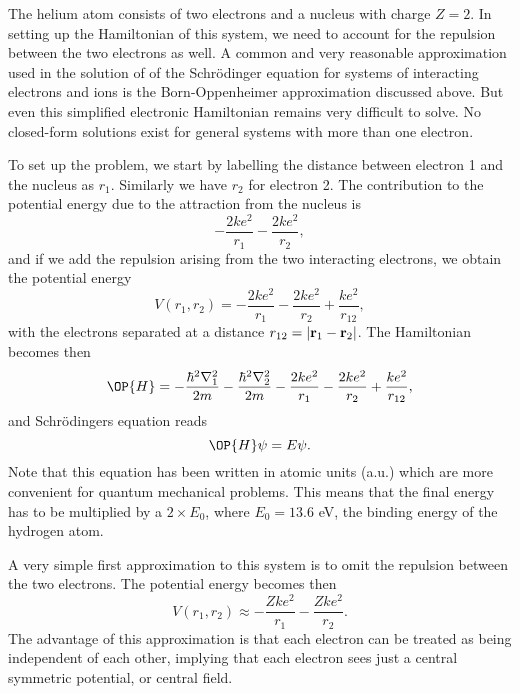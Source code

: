 The helium atom consists of two electrons and a nucleus with
charge $Z=2$. 
In setting up the Hamiltonian of this system, we need to account for
the repulsion between the two electrons as well. 
A common and very reasonable approximation used in the solution of 
of the Schr\"odinger equation for systems of interacting electrons and ions 
is the Born-Oppenheimer approximation discussed above. 
But even this simplified electronic Hamiltonian remains very difficult to
solve. No closed-form solutions exist for 
general systems with more than one electron. 

To set up the problem, 
we start by labelling the distance between electron 1 and the nucleus as 
$r_1$. Similarly we have $r_2$ for electron 2.
The contribution  
to the potential energy due to the attraction from the nucleus is
\[
   -\frac{2ke^2}{r_1}-\frac{2ke^2}{r_2},
\] 
and if we add the repulsion arising from the two 
interacting electrons, we obtain the potential energy
\[
 V(r_1, r_2)=-\frac{2ke^2}{r_1}-\frac{2ke^2}{r_2}+
               \frac{ke^2}{r_{12}},
\]
with the electrons separated at a distance 
$r_{12}=|{\bf r}_1-{\bf r}_2|$.
The Hamiltonian becomes then
\[
   \OP{H}=-\frac{\hbar^2\nabla_1^2}{2m}-\frac{\hbar^2\nabla_2^2}{2m}
          -\frac{2ke^2}{r_1}-\frac{2ke^2}{r_2}+
               \frac{ke^2}{r_{12}},
\]
and  Schr\"odingers equation reads
\[
   \OP{H}\psi=E\psi.
\]
Note that this equation has been written in atomic units (a.u.) 
which are more convenient for quantum mechanical problems.
This means that the final energy has to be multiplied by a $2\times E_0$,
where $E_0=13.6$ eV, the binding energy of the hydrogen atom. 

A very simple first approximation to this system is to omit
the repulsion between the two electrons. The potential energy becomes
then
\[
    V(r_1, r_2)\approx -\frac{Zke^2}{r_1}-
                      \frac{Zke^2}{r_2}.
\]
The advantage of this approximation is that each electron can be 
treated as being independent of each other, implying that
each electron sees just a central symmetric potential, or central
field.


